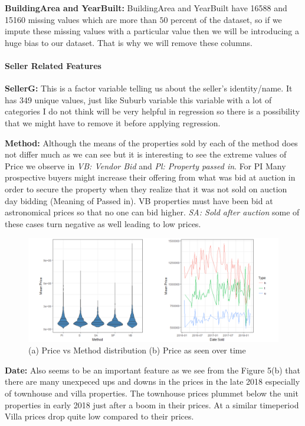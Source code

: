 \documentclass[]{article}
\let\oldparagraph\paragraph
\renewcommand{\paragraph}[1]{\oldparagraph{#1}\mbox{}}
\begin{document}
\textbf{BuildingArea and YearBuilt:} BuildingArea and YearBuilt have
16588 and 15160 missing values which are more than \(50\) percent of the
dataset, so if we impute these missing values with a particular value
then we will be introducing a huge bias to our dataset. That is why we
will remove these columns.

\paragraph{Seller Related Features}\label{seller-related-features}

\textbf{SellerG:} This is a factor variable telling us about the
seller's identity/name. It has 349 unique values, just like Suburb
variable this variable with a lot of categories I do not think will be
very helpful in regression so there is a possibility that we might have
to remove it before applying regression.

\textbf{Method:} Although the means of the properties sold by each of
the method does not differ much as we can see but it is interesting to
see the extreme values of Price we observe in \emph{VB: Vendor Bid} and
\emph{Pl: Property passed in}. For PI Many prospective buyers might
increase their offering from what was bid at auction in order to secure
the property when they realize that it was not sold on auction day
bidding (Meaning of Passed in). VB properties must have been bid at
astronomical prices so that no one can bid higher. \emph{SA: Sold after
auction} some of these cases turn negative as well leading to low
prices.

\begin{figure}
\centering
\includegraphics{Report_files/figure-latex/unnamed-chunk-5-1.pdf}
\caption{(a) Price vs Method distribution (b) Price as seen over time}
\end{figure}

\textbf{Date:} Also seems to be an important feature as we see from the
Figure 5(b) that there are many unexpeced ups and downs in the prices in
the late 2018 especially of townhouse and villa properties. The
townhouse prices plummet below the unit properties in early 2018 just
after a boom in their prices. At a similar timeperiod Villa prices drop
quite low compared to their prices.
\end{document}
